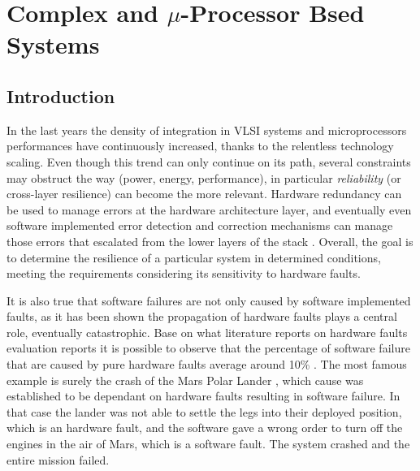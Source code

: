\documentclass[./dissertation.tex]{subfiles}
\begin{document}
    \chapter{Complex and $\mu$-Processor Bsed Systems}
\section{Introduction}
\label{introduction}
In the last years the density of integration in VLSI systems and microprocessors performances have continuously increased, thanks to the relentless technology scaling. Even though this trend can only continue on its path, several constraints may obstruct the way (power, energy, performance), in particular \textit{reliability} (or cross-layer resilience) can become the more relevant. Hardware redundancy can be used to manage errors at the hardware architecture layer, and eventually even software implemented error detection and correction mechanisms can manage those errors that escalated from the lower layers of the stack \cite{7544311} \cite{6560692}. Overall, the goal is to determine the resilience of a particular system in determined conditions, meeting the requirements considering its sensitivity to hardware faults.

It is also true that software failures are not only caused by software implemented faults, as it has been shown \cite{6258310} the propagation of hardware faults plays a central role, eventually catastrophic. Base on what literature reports on hardware faults evaluation reports \cite{EBRAHIMI20141000} \cite{7604674} it is possible to observe that the percentage of software failure that are caused by pure hardware faults average around 10\% \cite{kooli:lirmm-01693156}. The most famous example is surely the crash of the Mars Polar Lander \cite{1181509}, which cause was established to be dependant on hardware faults resulting in software failure. In that case the lander was not able to settle the legs into their deployed position, which is an hardware fault, and the software gave a wrong order to turn off the engines in the air of Mars, which is a software fault. The system crashed and the entire mission failed.
\end{document}
